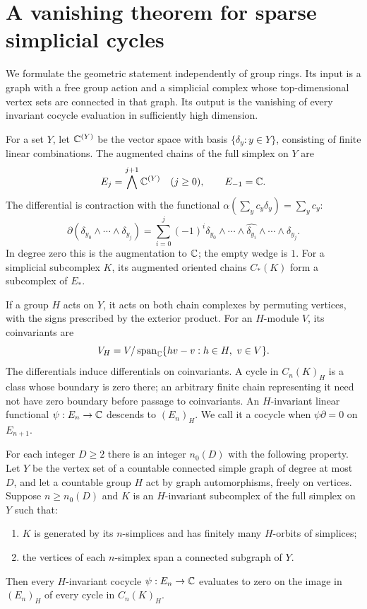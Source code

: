 \section{A vanishing theorem for sparse simplicial cycles}
\label{sec:framework}

We formulate the geometric statement independently of group rings.
Its input is a graph with a free group action and a simplicial complex
whose top-dimensional vertex sets are connected in that graph. Its output
is the vanishing of every invariant cocycle evaluation in sufficiently
high dimension.

For a set $Y$, let $\mathbb C^{(Y)}$ be the vector space with basis
$\{\delta_y:y\in Y\}$, consisting of finite linear combinations. The
augmented chains of the full simplex on $Y$ are
\[
 E_j=\bigwedge^{j+1}\mathbb C^{(Y)}\quad(j\geq0),\qquad E_{-1}=\mathbb C.
\]
The differential is contraction with the functional
$\alpha(\sum_y c_y\delta_y)=\sum_y c_y$:
\begin{equation}\label{eq:boundary}
 \partial(\delta_{y_0}\wedge\cdots\wedge\delta_{y_j})
 =\sum_{i=0}^{j}(-1)^i
 \delta_{y_0}\wedge\cdots\wedge\widehat{\delta_{y_i}}
 \wedge\cdots\wedge\delta_{y_j}.
\end{equation}
In degree zero this is the augmentation to $\mathbb C$; the empty wedge is $1$.
For a simplicial subcomplex $K$, its augmented oriented chains
$C_*(K)$ form a subcomplex of $E_*$.

If a group $H$ acts on $Y$, it acts on both chain complexes by permuting
vertices, with the signs prescribed by the exterior product. For an
$H$-module $V$, its coinvariants are
\[
 V_H=V/\operatorname{span}_{\C}\{hv-v:h\in H,\ v\in V\}.
\]
The differentials induce differentials on coinvariants. A cycle in
$C_n(K)_H$ is a class whose boundary is zero there; an arbitrary finite
chain representing it need not have zero boundary before passage to
coinvariants. An $H$-invariant linear functional $\psi:E_n\to\mathbb C$
descends to $(E_n)_H$. We call it a cocycle when
$\psi\partial=0$ on $E_{n+1}$.

\begin{theorem}\label{thm:sparse}
For each integer $D\geq2$ there is an integer $n_0(D)$ with the following
property. Let $Y$ be the vertex set of a countable connected simple graph
of degree at most $D$, and let a countable group $H$ act by graph
automorphisms, freely on vertices. Suppose $n\geq n_0(D)$ and $K$ is an
$H$-invariant subcomplex of the full simplex on $Y$ such that:
\begin{enumerate}[label=\textup{(\roman*)}]
 \item $K$ is generated by its $n$-simplices and has finitely many
 $H$-orbits of simplices;
 \item the vertices of each $n$-simplex span a connected subgraph of $Y$.
\end{enumerate}
Then every $H$-invariant cocycle $\psi:E_n\to\mathbb C$ evaluates to zero on
the image in $(E_n)_H$ of every cycle in $C_n(K)_H$.
\end{theorem}


